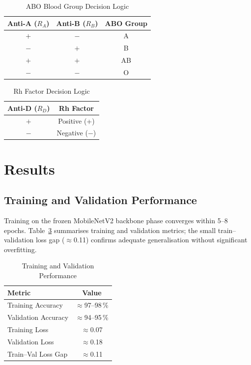 \documentclass[conference]{IEEEtran}
\begin{document}
\begin{table}[htbp]
  \caption{ABO Blood Group Decision Logic}
  \label{tab:abo_logic}
  \centering
  \begin{tabular}{ccc}
    \toprule
    \textbf{Anti-A ($R_A$)} & \textbf{Anti-B ($R_B$)} &
    \textbf{ABO Group} \\
    \midrule
    $+$ & $-$ & A  \\
    $-$ & $+$ & B  \\
    $+$ & $+$ & AB \\
    $-$ & $-$ & O  \\
    \bottomrule
  \end{tabular}
\end{table}

\begin{table}[htbp]
  \caption{Rh Factor Decision Logic}
  \label{tab:rh_logic}
  \centering
  \begin{tabular}{cc}
    \toprule
    \textbf{Anti-D ($R_D$)} & \textbf{Rh Factor} \\
    \midrule
    $+$ & Positive (+) \\
    $-$ & Negative ($-$) \\
    \bottomrule
  \end{tabular}
\end{table}

\section{Results}

\subsection{Training and Validation Performance}

Training on the frozen MobileNetV2 backbone phase converges within
5--8 epochs.
Table~\ref{tab:results} summarises training and validation metrics;
the small train--validation loss gap ($\approx$0.11) confirms
adequate generalisation without significant overfitting.

\begin{table}[htbp]
  \caption{Training and Validation Performance}
  \label{tab:results}
  \centering
  \begin{tabular}{lc}
    \toprule
    \textbf{Metric} & \textbf{Value} \\
    \midrule
    Training Accuracy   & $\approx$97--98\,\% \\
    Validation Accuracy & $\approx$94--95\,\% \\
    Training Loss       & $\approx$0.07 \\
    Validation Loss     & $\approx$0.18 \\
    Train--Val Loss Gap & $\approx$0.11 \\
    \bottomrule
  \end{tabular}
\end{table}
\end{document}
